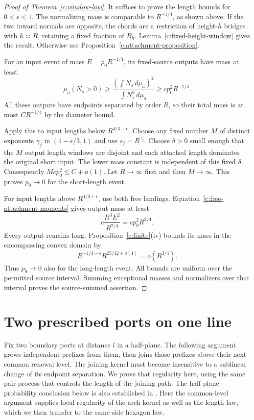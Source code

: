 \documentclass[11pt]{article}
\numberwithin{equation}{section}
\theoremstyle{definition}\newtheorem{definition}[theorem]{Definition}
\theoremstyle{remark}\newtheorem{remark}[theorem]{Remark}
\begin{document}
\begin{proof}[Proof of Theorem~\ref{c:window-law}]
It suffices to prove the length bounds for $0<\epsilon<1$.
The normalizing mass is comparable to $R^{-1/4}$, as shown above.
If the two inward normals are opposite, the chords are a restriction
of height-$h$ bridges with $h\asymp R$, retaining a fixed fraction of
$B_h$. Lemma~\ref{c:fixed-height-window} gives the result. Otherwise
use Proposition~\ref{c:attachment-proposition}.

For an input event of mass $E=p_0R^{-1/4}$, its fixed-source outputs
have mass at least
\[
 \mu_a(N_s>0)\ge
 \frac{(\int N_s\,d\mu_a)^2}{\int N_s^2\,d\mu_a}
 \ge cp_0^2R^{-1/4}.
\]
All these outputs have endpoints separated by order $R$, so their
total mass is at most $CR^{-1/4}$ by the diameter bound.

Apply this to input lengths below $R^{4/3-\epsilon}$. Choose any fixed
number $M$ of distinct exponents $\gamma_j$ in
$(1-\epsilon/3,1)$ and use $s_j=R^{\gamma_j}$. Choose $\delta>0$
small enough that the $M$ output length windows are disjoint and each
attached length dominates the original short input. The lower mass
constant is independent of this fixed $\delta$. Consequently
$Mcp_0^2\le C+o(1)$. Let $R\to\infty$ first and then $M\to\infty$.
This proves $p_0\to0$ for the short-length event.

For input lengths above $R^{4/3+\epsilon}$, use both free landings.
Equation~\eqref{c:free-attachment-moments} gives output mass at least
\[
 c\frac{R^3E^2}{R^{7/4}}=cp_0^2R^{3/4}.
\]
Every output remains long. Proposition~\ref{c:finite}(iv) bounds its
mass in the encompassing convex domain by
\[
 R^{-4/3-\epsilon}R^{25/12+o(1)}=o(R^{3/4}).
\]
Thus $p_0\to0$ also for the long-length event. All bounds are uniform
over the permitted source interval. Summing exceptional masses and
normalizers over that interval proves the source-summed assertion.
\end{proof}

\section{Two prescribed ports on one line}\label{c:same-side}
Fix two boundary ports at distance $l$ in a half-plane. The following
argument grows independent prefixes from them, then joins those prefixes
above their next common renewal level. The joining kernel must become
insensitive to a sublinear change of its endpoint separation. We prove
that regularity here, using the same pair process that controls the
length of the joining path.
The half-plane probability conclusion below is also established in
\cite[Proposition~5.8]{Renewal}. Here the common-level argument supplies
local regularity of the arch kernel as well as the length law, which we
then transfer to the same-side hexagon law.
\end{document}

